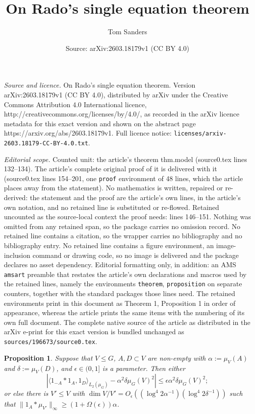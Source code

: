 \documentclass[10pt,a4paper]{amsart}
\title{On Rado's single equation theorem}
\author{Tom Sanders}
\date{Source: arXiv:2603.18179v1 (CC BY 4.0)}
\newtheorem{proposition}{Proposition}
\begin{document}
\maketitle

\noindent\emph{Source and licence.} On Rado's single equation theorem. Version arXiv:2603.18179v1 (CC BY 4.0), distributed by arXiv under the Creative Commons Attribution 4.0 International licence, http://creativecommons.org/licenses/by/4.0/, as recorded in the arXiv licence metadata for this exact version and shown on the abstract page https://arxiv.org/abs/2603.18179v1. Full licence notice: \texttt{licenses/arxiv-2603.18179-CC-BY-4.0.txt}.\par\smallskip

\noindent\textit{Editorial scope.} Counted unit: the article's theorem thm.model (source0.tex lines 132--134). The article's complete original proof of it is delivered with it (source0.tex lines 154--201, one \texttt{proof} environment of 48 lines, which the article places away from the statement). No mathematics is written, repaired or re-derived: the statement and the proof are the article's own lines, in the article's own notation, and no retained line is substituted or re-flowed.  Retained uncounted as the source-local context the proof needs: lines 146--151.  Nothing was omitted from any retained span, so the package carries no omission record.  No retained line contains a citation, so the wrapper carries no bibliography and no bibliography entry.  No retained line contains a figure environment, an image-inclusion command or drawing code, so no image is delivered and the package declares no asset dependency.  Editorial formatting only, in addition: an AMS \texttt{amsart} preamble that restates the article's own declarations and macros used by the retained lines, namely the environments \texttt{theorem}, \texttt{proposition} on separate counters, together with the standard packages those lines need.  The retained environments print in this document as Theorem 1, Proposition 1 in order of appearance, whereas the article prints the same items with the numbering of its own full document.  The complete native source of the article as distributed in the arXiv e-print for this exact version is bundled unchanged as \texttt{sources/196673/source0.tex}.
\begin{proposition}\label{prop.sum} Suppose that $V \leq G$, $A,D \subset V$ are non-empty with $\alpha:=\mu_V(A)$ and $\delta:=\mu_V(D)$, and $\epsilon \in (0,1]$ is a parameter. Then either
\begin{equation*}
|\langle 1_{-A}  \ast  1_{A}, 1_D\rangle_{L_2(\mu_G)}-\alpha^2\delta\mu_G(V)^2| \leq \epsilon \alpha^2\delta\mu_G(V)^2; 
\end{equation*}
 or else there is $V' \leq V$ with $\dim V/V' = O_\epsilon((\log^4 2\alpha^{-1})(\log^4 2\delta^{-1}))$ such that $\|1_A \ast \mu_{V'}\|_\infty \geq (1+\Omega(\epsilon))\alpha$.
\end{proposition}
\end{document}
